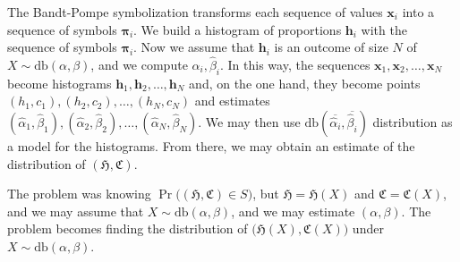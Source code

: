 \documentclass[12pt]{article}
\begin{document}
The Bandt-Pompe symbolization transforms each sequence of values $\bm x_i$ into a sequence of symbols $\bm \pi_i$.
We build a histogram of proportions $\bm h_i$ with the sequence of symbols $\bm \pi_i$.
Now we assume that $\bm h_i$ is an outcome of size $N$ of $X\sim\text{db}(\alpha,\beta)$, and we compute $\widehat\alpha_i,\widehat\beta_i$.
In this way, the sequences $\bm x_1,\bm x_2, \dots, \bm x_N$ become histograms $\bm h_1, \bm h_2, \dots, \bm h_N$ and, on the one hand, they become points $(h_1,c_1), (h_2,c_2), \dots , (h_N,c_N)$ and estimates $(\widehat\alpha_1,\widehat\beta_1), (\widehat\alpha_2,\widehat\beta_2), \dots , (\widehat\alpha_N,\widehat\beta_N)$.
We may then use $\text{db}(\overline{\widehat{\alpha}_i},\overline{\widehat{\beta}_i})$ distribution as a model for the histograms.
From there, we may obtain an estimate of the distribution of $(\mathfrak{H},\mathfrak{C})$.

The problem was knowing $\Pr\big((\mathfrak{H},\mathfrak{C})\in S\big)$, but $\mathfrak{H}=\mathfrak{H}(X)$  and $\mathfrak{C} = \mathfrak{C}(X)$, and we may assume that $X\sim\text{db}(\alpha,\beta)$, and we may estimate $(\alpha,\beta)$.
The problem becomes finding the distribution of $\big(\mathfrak{H}(X),\mathfrak{C}(X)\big)$ under $X\sim\text{db}(\alpha,\beta)$.




\end{document}
